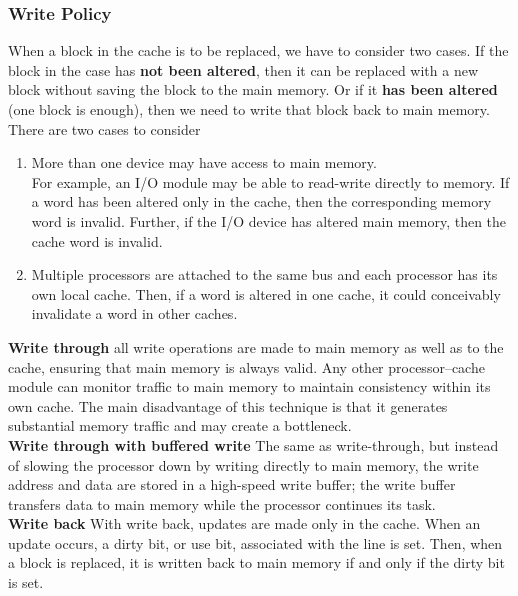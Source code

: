 \documentclass[titlepage, a4paper]{article}
\begin{document}
\subsubsection{Write Policy}
When a block in the cache is to be replaced, we have to consider two cases. If the block in the case has \textbf{not been altered}, then it can be replaced with a new block without saving the block to the main memory. Or if it \textbf{has been altered} (one block is enough), then we need to write that block back to main memory. \\

There are two cases to consider
\begin{enumerate}
\item More than one device may have access to main memory. \\
  
  For example, an I/O module may be able to read-write directly to memory. If a word has been altered only in the cache, then the corresponding memory word is invalid. Further, if the I/O device has altered main memory, then the cache word is invalid. \\
\item Multiple processors are attached to the same bus and each processor has its own local cache. Then, if a word is altered in one cache, it could conceivably invalidate a word in other caches.
\end{enumerate}
\textbf{Write through} all write operations are made to main memory as well as to the cache, ensuring that main memory is always valid. Any other processor–cache module can monitor traffic to main memory to maintain consistency within its own cache. The main disadvantage of this technique is that it generates substantial memory traffic and may create a bottleneck.\\

\textbf{Write through with buffered write} The same as write-through, but instead of slowing the processor down by writing directly to main memory, the write address and data
are stored in a high-speed write buffer; the write buffer transfers data to main memory while the processor continues its task.\\

\textbf{Write back} With write back, updates are made only in the cache. When an update occurs, a dirty bit, or use bit, associated with the line is set. Then, when a block is replaced, it is written back to main memory if and only if the dirty bit is set. \\
\end{document}
